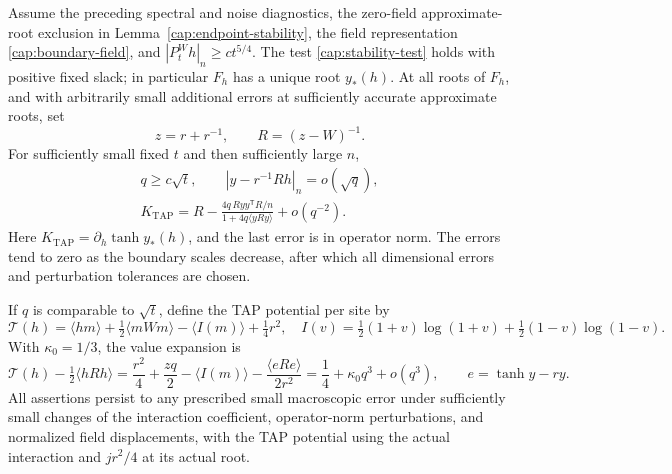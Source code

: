 \begin{proposition}\label{cap:tap-expansion}
Assume the preceding spectral and noise diagnostics, the zero-field
approximate-root exclusion in Lemma~\ref{cap:endpoint-stability}, the field
representation \eqref{cap:boundary-field}, and
$|P_t^Wh|_n\ge ct^{5/4}$. The test \eqref{cap:stability-test} holds with
positive fixed slack; in particular $F_h$ has a unique root $y_*(h)$.
At all roots of $F_h$,
and with arbitrarily small additional errors at sufficiently accurate
approximate roots, set
\[
 z=r+r^{-1},\qquad R=(z-W)^{-1}.
\]
For sufficiently small fixed $t$ and then sufficiently large $n$,
\begin{equation}\label{cap:tap-leading}
 \begin{gathered}
 q\ge c\sqrt t,\qquad |y-r^{-1}Rh|_n=o(\sqrt q),\\
 K_{\mathrm{TAP}}
 =R-\frac{4q\,Ryy^{\mathsf T}R/n}
                 {1+4q\langle yRy\rangle}+o(q^{-2}).
 \end{gathered}
\end{equation}
Here $K_{\mathrm{TAP}}=\partial_h\tanh y_*(h)$, and the last error
is in operator norm. The errors tend to zero as the boundary scales
decrease, after which all dimensional errors and perturbation tolerances
are chosen.

If $q$ is comparable to $\sqrt t$, define the TAP potential per site by
\[
 \mathcal T(h)=\langle hm\rangle+\tfrac12\langle mWm\rangle
                  -\langle I(m)\rangle+\tfrac14r^2,
 \quad
 I(v)=\tfrac12(1+v)\log(1+v)+\tfrac12(1-v)\log(1-v).
\]
With $\kappa_0=1/3$, the value expansion is
\begin{equation}\label{cap:tap-value}
 \mathcal T(h)-\tfrac12\langle hRh\rangle
 =\frac{r^2}{4}+\frac{zq}{2}-\langle I(m)\rangle
                    -\frac{\langle eRe\rangle}{2r^2}
 =\frac14+\kappa_0q^3+o(q^3),
 \qquad e=\tanh y-ry.
\end{equation}
All assertions persist to any prescribed small macroscopic error under
sufficiently small changes of the interaction coefficient, operator-norm
perturbations, and normalized field displacements, with the TAP potential
using the actual interaction and $jr^2/4$ at its actual root.
\end{proposition}

